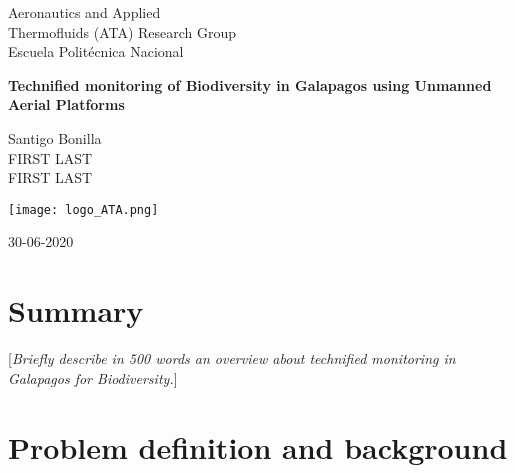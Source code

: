 \documentclass[10pt,english, openany]{book}
\begin{document}

\begin{titlepage}
	\clearpage\thispagestyle{empty}
	\centering
	\vspace{1cm}

	{\normalsize Aeronautics and Applied \\ 
		Thermofluids (ATA) Research Group \\
		Escuela Politécnica Nacional \par}
		\vspace{3cm}
	{\Huge \textbf{Technified monitoring of Biodiversity in Galapagos using Unmanned Aerial Platforms}} \\
	\vspace{4cm}
	{\normalsize Santigo Bonilla \\ %
	             FIRST LAST \\
	             FIRST LAST\par}
	\vspace{5cm}
    
    \centering \texttt{[image: logo\_ATA.png]}
    
    \vspace{0.5cm}
		
	{\normalsize 30-06-2020 \par}
	
	\pagebreak

\end{titlepage}

\tableofcontents{}

\mainmatter

\chapter{Summary}\label{chapt:sum}
[\textit{Briefly describe in 500 words an overview about technified monitoring in Galapagos for Biodiversity.}]

\chapter{Problem definition and background}
\end{document}
